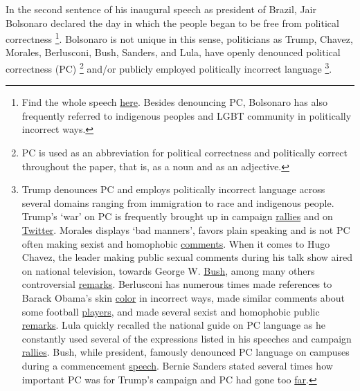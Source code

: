 \documentclass[smallextended]{svjour3}       %
\begin{document}
In the second sentence of his inaugural speech as president of Brazil,
Jair Bolsonaro declared the day in which the people began to be free
from political correctness \footnote{ Find the whole speech
  \href{https://www.youtube.com/watch?v=5iPVlE_9kFw}{here}. Besides
  denouncing PC, Bolsonaro has also frequently referred to indigenous
  peoples and LGBT community in politically incorrect ways.}. Bolsonaro
is not unique in this sense, politicians as Trump, Chavez, Morales,
Berlusconi, Bush, Sanders, and Lula, have openly denounced political
correctness (PC) \footnote{ PC is used as an abbreviation for political
  correctness and politically correct throughout the paper, that is, as
  a noun and as an adjective.} and/or publicly employed politically
incorrect language \footnote{ Trump denounces PC and employs politically
  incorrect language across several domains ranging from immigration to
  race and indigenous people. Trump's `war' on PC is frequently brought
  up in campaign
  \href{https://edition.cnn.com/2018/10/30/politics/donald-trump-hate-speech-anti-semitism-steve-king-kevin-mccarthy/index.html}{rallies}
  and on
  \href{https://www.thetrumparchive.com/?searchbox=\%22politically+correct\%22}{Twitter}.
  Morales displays `bad manners', favors plain speaking and is not PC
  often making sexist and homophobic
  \href{https://www.bbc.com/news/world-latin-america-34851896}{comments}.
  When it comes to Hugo Chavez, the leader making public sexual comments
  during his talk show aired on national television, towards George W.
  \href{https://www.youtube.com/watch?v=lOsABwCrn3E}{Bush}, among many
  others controversial
  \href{https://elpais.com/internacional/2013/03/06/actualidad/1362528053_830886.html}{remarks}.
  Berlusconi has numerous times made references to Barack Obama's skin
  \href{https://www.theguardian.com/world/2009/sep/28/obama-tan-berlusconi}{color}
  in incorrect ways, made similar comments about some football
  \href{https://www.si.com/soccer/2013/02/06/mario-balotelli-racism-ac-milan}{players},
  and made several sexist and homophobic public
  \href{https://time.com/5179379/italy-silvio-berlusconi-sexist-remarks-women/}{remarks}.
  Lula quickly recalled the national guide on PC language as he
  constantly used several of the expressions listed in his speeches and
  campaign
  \href{https://www1.folha.uol.com.br/folha/brasil/ult96u68810.shtml}{rallies}.
  Bush, while president, famously denounced PC language on campuses
  during a commencement
  \href{https://www.youtube.com/watch?v=4IORaF6fi_Y}{speech}. Bernie
  Sanders stated several times how important PC was for Trump's campaign
  and PC had gone too
  \href{https://qz.com/865263/bernie-sanders-and-political-correctness-democrats-are-learning-all-the-wrong-lessons-from-donald-trump-election-win/}{far}.}.
\end{document}
